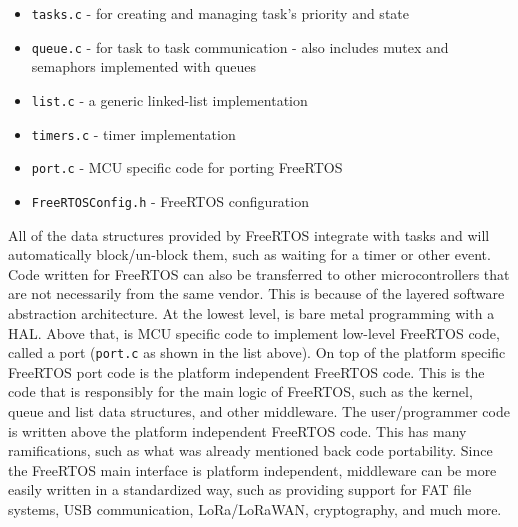 \begin{itemize}
	\item \texttt{tasks.c} - for creating and managing task's priority and state
	\item \texttt{queue.c} - for task to task communication - also includes mutex and
		semaphors implemented with queues
	\item \texttt{list.c} - a generic linked-list implementation
	\item \texttt{timers.c} - timer implementation
	\item \texttt{port.c} - MCU specific code for porting FreeRTOS
	\item \texttt{FreeRTOSConfig.h} - FreeRTOS configuration
\end{itemize}

All of the data structures provided by FreeRTOS integrate with tasks and will
automatically block/un-block them, such as waiting for a timer or other event.
Code written for FreeRTOS can also be transferred to other microcontrollers that
are not necessarily from the same vendor. This is because of the layered
software abstraction architecture. At the lowest level, is bare metal
programming with a HAL. Above that, is MCU specific code to implement low-level
FreeRTOS code, called a port (\texttt{port.c} as shown in the list above). On top
of the platform specific FreeRTOS port code is the platform independent FreeRTOS
code. This is the code that is responsibly for the main logic of FreeRTOS, such
as the kernel, queue and list data structures, and other middleware. The
user/programmer code is written above the platform independent FreeRTOS code.
This has many ramifications, such as what was already mentioned back code
portability. Since the FreeRTOS main interface is platform independent,
middleware can be more easily written in a standardized way, such as providing
support for FAT file systems, USB communication, LoRa/LoRaWAN, cryptography, and
much more.

